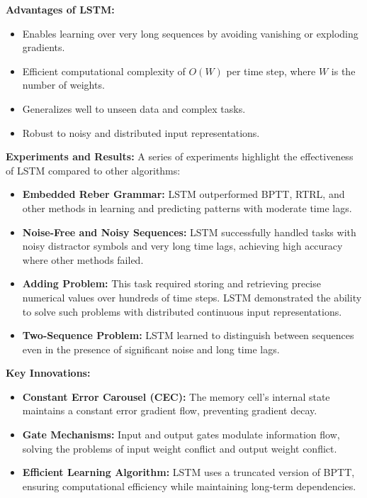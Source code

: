 \textbf{Advantages of LSTM:}
\begin{itemize}
    \item Enables learning over very long sequences by avoiding vanishing or exploding gradients.
    \item Efficient computational complexity of $O(W)$ per time step, where $W$ is the number of weights.
    \item Generalizes well to unseen data and complex tasks.
    \item Robust to noisy and distributed input representations.
\end{itemize}

\textbf{Experiments and Results:} A series of experiments highlight the effectiveness of LSTM compared to other algorithms:
\begin{itemize}
    \item \textbf{Embedded Reber Grammar:} LSTM outperformed BPTT, RTRL, and other methods in learning and predicting patterns with moderate time lags.
    \item \textbf{Noise-Free and Noisy Sequences:} LSTM successfully handled tasks with noisy distractor symbols and very long time lags, achieving high accuracy where other methods failed.
    \item \textbf{Adding Problem:} This task required storing and retrieving precise numerical values over hundreds of time steps. LSTM demonstrated the ability to solve such problems with distributed continuous input representations.
    \item \textbf{Two-Sequence Problem:} LSTM learned to distinguish between sequences even in the presence of significant noise and long time lags.
\end{itemize}

\textbf{Key Innovations:}
\begin{itemize}
    \item \textbf{Constant Error Carousel (CEC):} The memory cell's internal state maintains a constant error gradient flow, preventing gradient decay.
    \item \textbf{Gate Mechanisms:} Input and output gates modulate information flow, solving the problems of input weight conflict and output weight conflict.
    \item \textbf{Efficient Learning Algorithm:} LSTM uses a truncated version of BPTT, ensuring computational efficiency while maintaining long-term dependencies.
\end{itemize}

